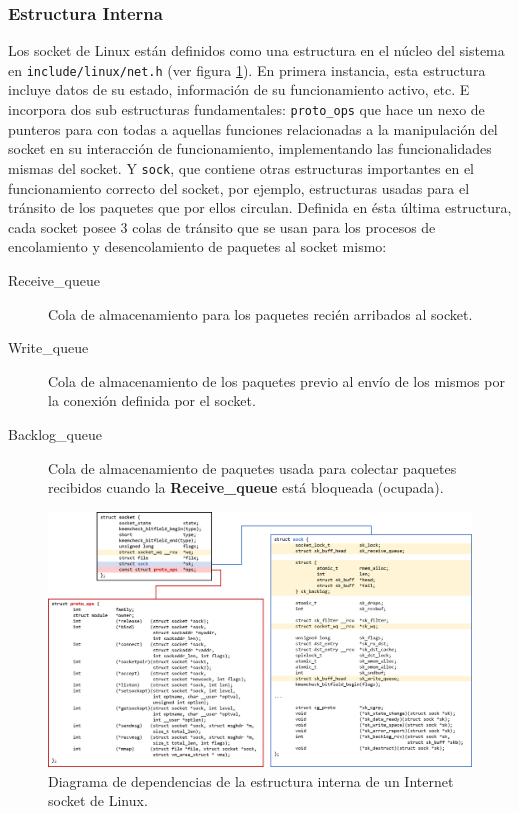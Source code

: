 \subsubsection{Estructura Interna}
Los socket de Linux están definidos como una estructura en el núcleo del sistema en \verb=include/linux/net.h= (ver figura \ref{fig:socketAnathomy}). En primera instancia, esta estructura incluye datos de su estado, información de su funcionamiento activo, etc. E incorpora dos sub estructuras fundamentales: \verb=proto_ops= que hace un nexo de punteros para con todas a aquellas funciones relacionadas a la manipulación del socket en su interacción de funcionamiento, implementando las funcionalidades mismas del socket. Y \verb=sock=, que contiene otras estructuras importantes en el funcionamiento correcto del socket, por ejemplo, estructuras usadas para el tránsito de los paquetes que por ellos circulan. Definida en ésta última estructura, cada socket posee 3 colas de tránsito que se usan para los procesos de encolamiento y desencolamiento de paquetes al socket mismo:
\begin{description}
\item[Receive\_queue] Cola de almacenamiento para los paquetes recién arribados al socket.
\item[Write\_queue] Cola de almacenamiento de los paquetes previo al envío de los mismos por la conexión definida por el socket.
\item[Backlog\_queue] Cola de almacenamiento de paquetes usada para colectar paquetes recibidos cuando la \textbf{Receive\_queue} está bloqueada (ocupada).
\end{description}

\begin{figure}[!h]
	\centering
	\includegraphics[scale=0.53]{imagenes/socketStructsDependecy.png}
	\caption{Diagrama de dependencias de la estructura interna de un Internet socket de Linux.}
	\label{fig:socketAnathomy}
\end{figure}

